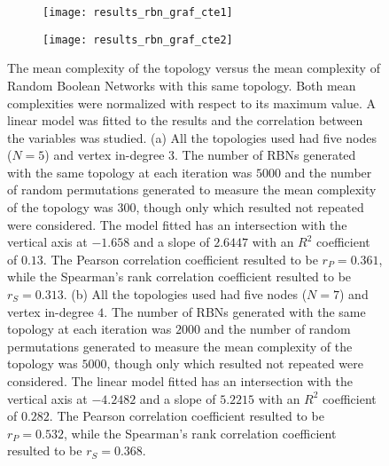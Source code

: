 \begin{figure}
	\centering
	\begin{subfigure}[b]{0.64\textwidth}
		\centering
		\texttt{[image: results\_rbn\_graf\_cte1]}
		\caption{}
		\label{fig:results_rbn_graf_cte1}
	\end{subfigure}
	\hspace{0.1mm}
	\begin{subfigure}[b]{0.64\textwidth}
		\centering
		\texttt{[image: results\_rbn\_graf\_cte2]}
		\caption{}
		\label{fig:results_rbn_graf_cte2}
	\end{subfigure}
	\caption[Correlation between the complexity of Random Boolean Networks and its topology.]{The mean complexity of the topology versus the mean complexity of Random Boolean Networks with this same topology. Both mean complexities were normalized with respect to its maximum value.  A linear model was fitted to the results and the correlation between the variables was studied. (a) All the topologies used had five nodes ($N=5$) and vertex in-degree $3$. The number of RBNs generated with the same topology at each iteration was $5000$ and the number of random permutations generated to measure the mean complexity of the topology was $300$, though only which resulted not repeated were considered. The model fitted has an intersection with the vertical axis at $-1.658$ and a slope of $2.6447$ with an $R^{2}$ coefficient of $0.13$. The Pearson correlation coefficient resulted to be $r_{P} =0.361$, while the Spearman's rank correlation coefficient resulted to be $r_{S} =0.313$. (b) All the topologies used had five nodes ($N=7$) and vertex in-degree $4$. The number of RBNs generated with the same topology at each iteration was $2000$ and the number of random permutations generated to measure the mean complexity of the topology was $5000$, though only which resulted not repeated were considered. The linear model fitted has an intersection with the vertical axis at $-4.2482$ and a slope of $5.2215$ with an $R^{2}$ coefficient of $0.282$. The Pearson correlation coefficient resulted to be $r_{P} =0.532$, while the Spearman's rank correlation coefficient resulted to be $r_{S} =0.368$.}
	\label{fig:results_rbn_graf_cte}
\end{figure}

